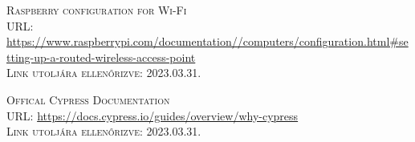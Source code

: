 \documentclass[
]{thesis-ekf}
\theoremstyle{definition}
\theoremstyle{remark}
\begin{document}
\begin{thebibliography}{20}
		\textsc{Raspberry configuration for Wi-Fi}\\
		\textsc{URL:} \url{https://www.raspberrypi.com/documentation//computers/configuration.html#setting-up-a-routed-wireless-access-point}\\
		\textsc{Link utoljára ellenőrizve:} 2023.03.31.
	
		\textsc{Offical Cypress Documentation}\\
		\textsc{URL:} \url{https://docs.cypress.io/guides/overview/why-cypress}\\
		\textsc{Link utoljára ellenőrizve:} 2023.03.31.
				
	\end{thebibliography}
	
	
\end{document}
